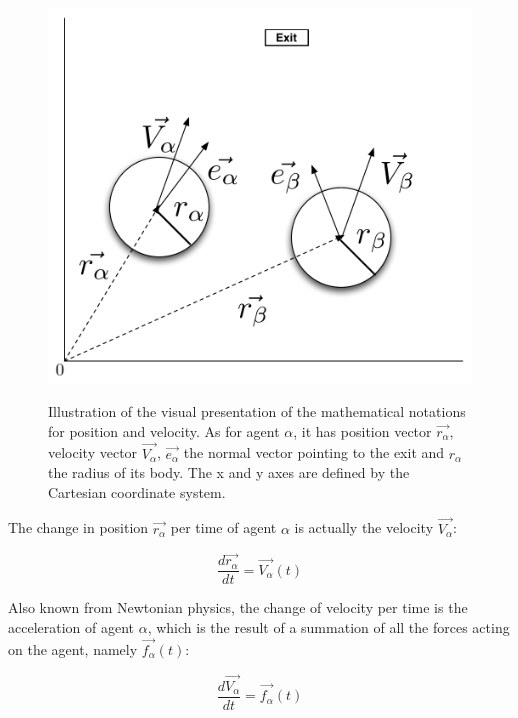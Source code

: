 \begin{figure}[hb]
    \centering
    {\includegraphics[scale=0.35]{Figures/NotationOfAgent.pdf}} 
    \caption[Notation of an agent]{Illustration of the visual presentation of the mathematical notations for position and velocity. As for agent $ \alpha $,
	    it has position vector $ \vec{r_{\alpha}} $, velocity vector $ \vec{V_{\alpha}} $, $\vec{e_{\alpha}}$ the normal vector pointing
	    to the exit and  $ r_{\alpha} $ the radius of its body.
	    The x and y axes are defined by the Cartesian coordinate system.}
    \label{NotationOfAgent}
\end{figure}

The change in position $ \vec{r_{\alpha}} $ per time of 
agent $\alpha$ is actually the velocity $ \vec{V_{\alpha}} $:

\begin{equation}
		\frac{d \vec{r_{\alpha}}}{dt} = \vec{V_{\alpha}} \left( t \right)
\end{equation}

Also known from Newtonian physics, the change of velocity per time is the acceleration of agent $\alpha$, which is the result of a summation of all the forces acting on the agent, namely $\vec{f_{\alpha}} \left( t \right)$:

\begin{equation}
    \frac{d \vec{V_{\alpha}}}{dt} = \vec{f_{\alpha}} \left( t \right) 
\end{equation}


